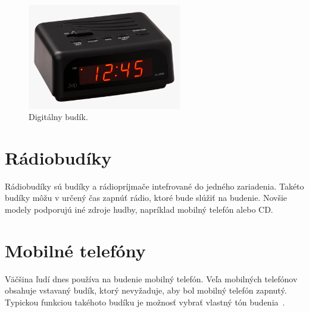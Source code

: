 \begin{figure}[h]
    \centering
    \includegraphics[width=0.6\textwidth]{img/digi.png}
    \caption{Digitálny budík.}
\end{figure}

\section{Rádiobudíky}
Rádiobudíky sú budíky a rádiopríjmače intefrované do jedného zariadenia. Takéto budíky môžu v určený čas zapnúť rádio, ktoré bude slúžiť na budenie. Novšie modely podporujú iné zdroje hudby, napríklad mobilný telefón alebo CD.

\section{Mobilné telefóny}
Väčšina ľudí dnes používa na budenie mobilný telefón.
Veľa mobilných telefónov obsahuje vstavaný budík, ktorý nevyžaduje, aby bol mobilný telefón zapnutý. Typickou funkciou takéhoto budíku je možnosť vybrať vlastný tón budenia~\cite{mb-clock}.
